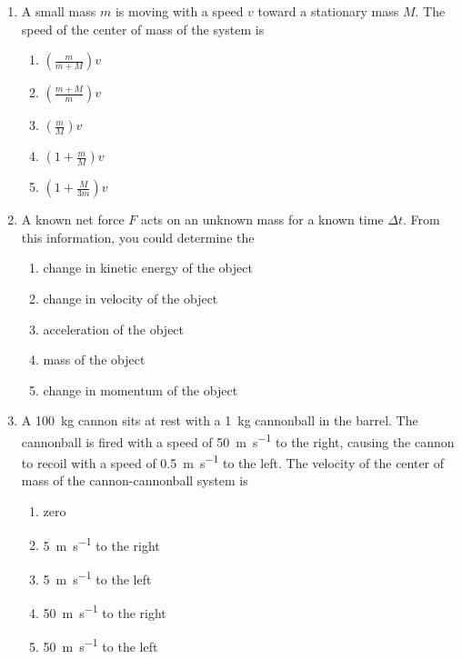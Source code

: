 \documentclass{../../../oss-apphys}
\begin{document}
\begin{multicols}{2}
\begin{enumerate}[leftmargin=18pt,resume]
  \item A small mass $m$ is moving with a speed $v$ toward a stationary mass
    $M$. The speed of the center of mass of the system is
    \begin{enumerate}[noitemsep,topsep=0pt,leftmargin=18pt,label=(\Alph*)]
    \item $\displaystyle\left(\frac{m}{m+M}\right)v$
    \item $\displaystyle\left(\frac{m+M}{m}\right)v$
    \item $\displaystyle\left(\frac{m}{M}\right)v$
    \item $\displaystyle\left(1+\frac{m}{M}\right)v$
    \item $\displaystyle\left(1+\frac{M}{3m}\right)v$
    \end{enumerate}

  \item A known net force $F$ acts on an unknown mass for a known time
    $\Delta t$. From this information, you could determine the
    \begin{enumerate}[noitemsep,topsep=0pt,leftmargin=18pt,label=(\Alph*)]
    \item change in kinetic energy of the object
    \item change in velocity of the object
    \item acceleration of the object
    \item mass of the object
    \item change in momentum of the object
    \end{enumerate}

  \item A \SI{100}{\kilo\gram} cannon sits at rest with a \SI{1}{\kilo\gram}
    cannonball in the barrel. The cannonball is fired with a speed of
    \SI{50}{\metre\per\second} to the right, causing the cannon to recoil with
    a speed of \SI{.5}{\metre\per\second} to the left. The velocity of the
    center of mass of the cannon-cannonball system is
    \begin{enumerate}[noitemsep,topsep=0pt,leftmargin=18pt,label=(\Alph*)]
    \item zero
    \item\SI{5}{\metre\per\second} to the right
    \item\SI{5}{\metre\per\second} to the left
    \item\SI{50}{\metre\per\second} to the right
    \item\SI{50}{\metre\per\second} to the left
    \end{enumerate}
  \end{enumerate}
  \columnbreak


\end{multicols}
\end{document}
